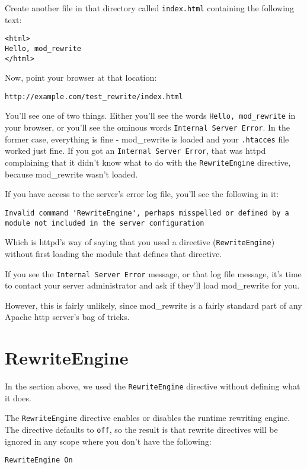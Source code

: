 Create another file in that directory called \verb~index.html~ containing the following text:

\begin{verbatim}
<html>
Hello, mod_rewrite
</html>
\end{verbatim}

Now, point your browser at that location:

\verb~http://example.com/test_rewrite/index.html~

You'll see one of two things. Either you'll see the words \verb~Hello, mod_rewrite~ in your browser, or you'll see the ominous words \verb~Internal Server Error~. In the former case, everything is fine - mod\_rewrite is loaded and your \verb~.htacces~ file worked just fine. If you got an \verb~Internal Server Error~, that was httpd complaining that it didn't know what to do with the \verb~RewriteEngine~ directive, because mod\_rewrite wasn't loaded.

If you have access to the server's error log file, you'll see the following in it:

\begin{verbatim}
Invalid command 'RewriteEngine', perhaps misspelled or defined by a module not included in the server configuration
\end{verbatim}

Which is httpd's way of saying that you used a directive (\verb~RewriteEngine~) without first loading the module that defines that directive.

If you see the \verb~Internal Server Error~ message, or that log file message, it's time to contact your server administrator and ask if they'll load mod\_rewrite for you.

However, this is fairly unlikely, since mod\_rewrite is a fairly standard part of any Apache http server's bag of tricks.

\section{RewriteEngine}

In the section above, we used the \verb~RewriteEngine~ directive without defining what it does.

The \verb~RewriteEngine~ directive enables or disables the runtime rewriting engine. The directive defaults to \verb~off~, so the result is that rewrite directives will be ignored in any scope where you don't have the following:

\verb~RewriteEngine On~

